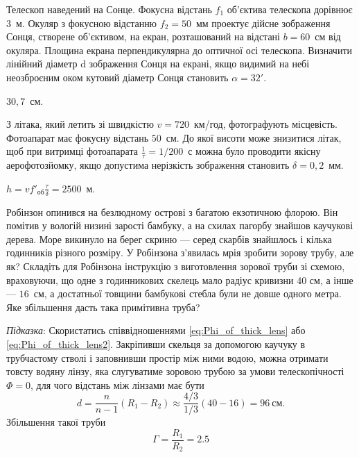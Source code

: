 \begin{problem}%
Телескоп наведений на Сонце. Фокусна відстань $f_1$ об'єктива
телескопа дорівнює $3$~м. Окуляр з фокусною відстанню $f_2 = 50$~мм
проектує дійсне зображення Сонця, створене об'єктивом, на екран,
розташований на відстані $b = 60$~см від окуляра. Площина екрана
перпендикулярна до оптичної осі телескопа. Визначити лінійний
діаметр d зображення Сонця на екрані, якщо видимий на небі
неозброєним оком кутовий діаметр Сонця становить $\alpha = 32'$.
\begin{solution}
	$30,7$~см.
\end{solution}
\end{problem}


\begin{problem}%
З літака, який летить зі швидкістю $v = 720$~км/год, фотографують
місцевість. Фотоапарат має фокусну відстань $50$~см. До якої висоти
може знизитися літак, щоб при витримці фотоапарата $\frac1{\tau} = 1/200$~с можна
було проводити якісну аерофотозйомку, якщо допустима нерізкість
зображення становить $\delta = 0,2$~мм.
\begin{solution}
	$h = v f'_\text{об} \frac{\tau}{\delta} = 2500$~м.
\end{solution}
\end{problem}


\begin{problem}%
Робінзон опинився на безлюдному острові з багатою екзотичною
флорою. Він помітив у вологій низині зарості бамбуку, а на схилах
пагорбу знайшов каучукові дерева. Море викинуло на берег скриню ---
серед скарбів знайшлось і кілька годинників різного розміру. У
Робінзона з’явилась мрія зробити зорову трубу, але як? Складіть для
Робінзона інструкцію з виготовлення зорової труби зі схемою,
враховуючи, що одне з годинникових скелець мало радіус кривизни 40
см, а інше --- $16$~см, а достатньої товщини бамбукові стебла були не
довше одного метра. Яке збільшення дасть така примітивна труба?
\begin{solution}
	\emph{Підказка}: Скористатись співвідношеннями \eqref{eq:Phi_of_thick_lens} або \eqref{eq:Phi_of_thick_lens2}.
	Закріпивши скельця за допомогою каучуку в трубчастому стволі і
	заповнивши простір між ними водою, можна отримати товсту водяну
	лінзу, яка слугуватиме зоровою трубою за умови телескопічності $\Phi = 0$,
	для чого відстань між лінзами має бути
	\begin{equation*}
		d = \frac{n}{n - 1}(R_1 - R_2) \approx \frac{4/3}{1/3}(40-16) = 96\ \text{см}.
	\end{equation*}
	Збільшення такої труби
	\begin{equation*}
		\Gamma = \frac{R_1}{R_2} = 2.5
	\end{equation*}
\end{solution}
\end{problem}


